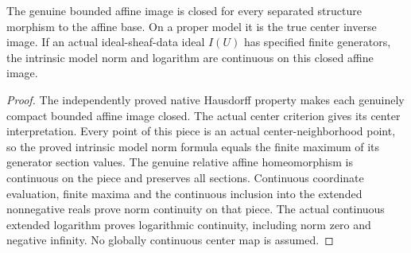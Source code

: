 \begin{theorem}
\label{scheme:closed-bounded-affine-model-functions}
\leanok
{}
The genuine bounded affine image is closed for every separated structure
morphism to the affine base. On a proper model it is the true center
inverse image. If an actual ideal-sheaf-data ideal $I(U)$ has specified
finite generators, the intrinsic model norm and logarithm are continuous
on this closed affine image.
\end{theorem}
\begin{proof}
The independently proved native Hausdorff property makes each genuinely
compact bounded affine image closed. The actual center criterion gives
its center interpretation. Every point of this piece is an actual
center-neighborhood point, so the proved intrinsic model norm
formula equals the finite maximum of its generator section values.
The genuine relative affine homeomorphism is continuous on the piece
and preserves all sections. Continuous coordinate evaluation, finite
maxima and the continuous inclusion into the extended nonnegative reals
prove norm continuity on that piece. The actual continuous extended
logarithm proves logarithmic continuity, including norm zero and
negative infinity. No globally continuous center map is assumed.
\end{proof}

